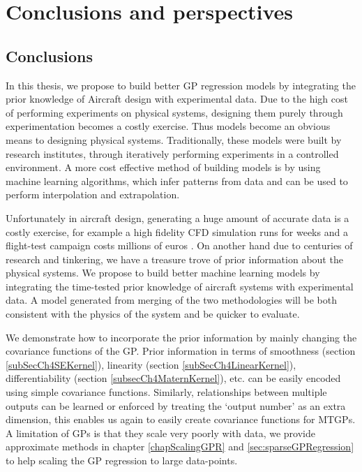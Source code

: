 \chapter{Conclusions and perspectives}
\label{chapConclusions}

\section{Conclusions}
In this thesis, we propose to build better GP regression models by integrating the prior knowledge of Aircraft design with experimental data. Due to the high cost of performing experiments on physical systems, designing them purely through experimentation becomes a costly exercise. Thus models become an obvious means to designing physical systems. Traditionally, these models were built by research institutes, through iteratively performing experiments in a controlled environment. A more cost effective method of building models is by using machine learning algorithms, which infer patterns from data and can be used to perform interpolation and extrapolation. 

Unfortunately in aircraft design, generating a huge amount of accurate data is a costly exercise, for example a high fidelity CFD simulation runs for weeks \cite{murthy2014computational, jameson2012computational, forrester2008engineering} and a flight-test campaign costs millions of euros \cite{fox2004test}. On another hand due to centuries of research and tinkering, we have a treasure trove of prior information about the physical systems. We propose to build better machine learning models by integrating the time-tested prior knowledge of aircraft systems with experimental data. A model generated from merging of the two methodologies will be both consistent with the physics of the system and be quicker to evaluate. 

We demonstrate how to incorporate the prior information by mainly changing the covariance functions of the GP. Prior information in terms of smoothness (section \ref{subSecCh4SEKernel}), linearity (section \ref{subSecCh4LinearKernel}), differentiability (section \ref{subsecCh4MaternKernel}), etc. can be easily encoded using simple covariance functions. Similarly, relationships between multiple outputs can be learned or enforced by treating the `output number' as an extra dimension, this enables us again to easily create covariance functions for MTGPs. A limitation of GPs is that they scale very poorly with data, we provide approximate methods in chapter \ref{chapScalingGPR} and \ref{sec:sparseGPRegression} to help scaling the GP regression to large data-points.

